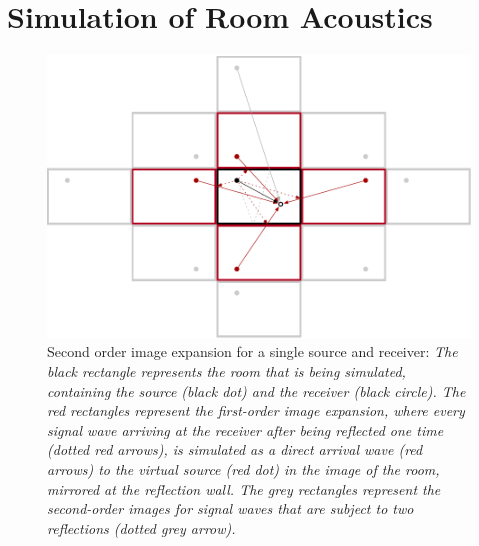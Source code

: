 \section{Simulation of Room Acoustics}
\label{sec:simulation}

\begin{figure}[!b]
\centering
    \includegraphics[width=\textwidth]{data/figures/image-method3}
    \caption[Second order image expansion for a single source and receiver]{Second order image expansion for a single source and receiver: \itshape The black rectangle represents the room that is being simulated, containing the source (black dot) and the receiver (black circle). The red rectangles represent the first-order image expansion, where every signal wave arriving at the receiver after being reflected one time (dotted red arrows), is simulated as a direct arrival wave (red arrows) to the virtual source (red dot) in the image of the room, mirrored at the reflection wall. The grey rectangles represent the second-order images for signal waves that are subject to two reflections (dotted grey arrow).}
    \label{fig:imageMethod}
\end{figure}

